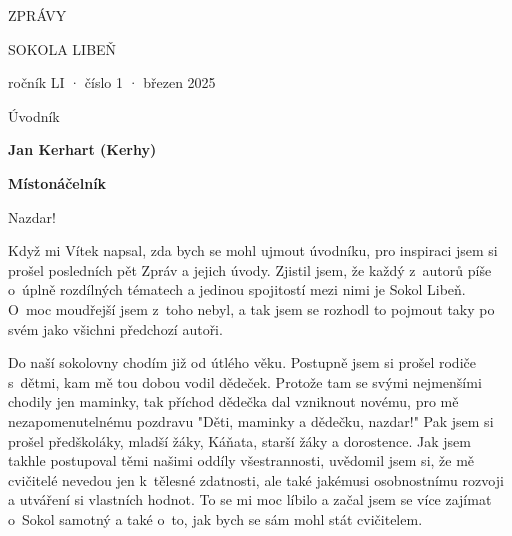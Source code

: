 \documentclass[11pt]{article}
\begin{document}
\pagecolor{sokolred}
\color{white}
\begin{center}

\vspace*{\fill}

{\titlesize \fugner ZPRÁVY}

{\titlesize \tyrs SOKOLA LIBEŇ}

\vspace*{1cm}

{\large ročník LI · číslo 1 · březen 2025}

\vspace*{\fill}
\end{center}

\clearpage
\normalcolor
\nopagecolor
{}

\pagestyle{uvodnik}


\clearpage

\pagestyle{uvodnik}

\setlength{\columnsep}{-2.5cm}
\begin{multicols}{2}
  {\fontsize{48pt}{57pt} \fugner \color{sokolred} \noindent Úvodník}

  \columnbreak

  \vspace*{-4pt}

  {\hfill\textbf{Jan Kerhart (Kerhy)}}
  
  {\hfill\textbf{Místonáčelník}}
 \end{multicols}

\vspace*{12pt}

\noindent
Nazdar!

\noindent
Když mi Vítek napsal, zda bych se mohl ujmout úvodníku, pro inspiraci jsem si prošel posledních pět Zpráv a jejich úvody. Zjistil jsem, že každý z~autorů píše o~úplně rozdílných tématech a jedinou spojitostí mezi nimi je Sokol Libeň. O~moc moudřejší jsem z~toho nebyl, a tak jsem se rozhodl to pojmout taky po svém jako všichni předchozí autoři.

Do naší sokolovny chodím již od útlého věku. Postupně jsem si prošel rodiče s~dětmi, kam mě tou dobou vodil dědeček. Protože tam se svými nejmenšími chodily jen maminky, tak příchod dědečka dal vzniknout novému, pro mě nezapomenutelnému pozdravu "Děti, maminky a dědečku, nazdar!" Pak jsem si prošel předškoláky, mladší žáky, Káňata, starší žáky a dorostence. Jak jsem takhle postupoval těmi našimi oddíly všestrannosti, uvědomil jsem si, že mě cvičitelé nevedou jen k~tělesné zdatnosti, ale také jakémusi osobnostnímu rozvoji a utváření si vlastních hodnot. To se mi moc líbilo a začal jsem se více zajímat o~Sokol samotný a také o~to, jak bych se sám mohl stát cvičitelem. 
\end{document}
